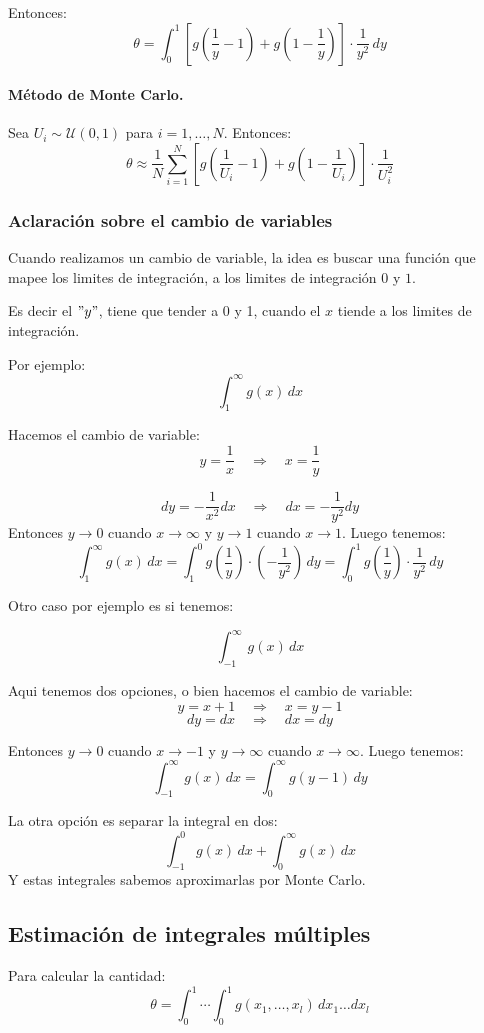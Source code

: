 \documentclass[11pt, a4paper]{article}
\theoremstyle{definition}
\begin{document}
Entonces:
\[
\theta = \int_{0}^{1} \left[ g\left(\frac{1}{y} - 1\right) + g\left(1 - \frac{1}{y}\right) \right] \cdot \frac{1}{y^2} \, dy
\]

\paragraph{Método de Monte Carlo.} Sea $U_i \sim \mathcal{U}(0,1)$ para $i = 1, \ldots, N$. Entonces:
\[
\theta \approx \frac{1}{N} \sum_{i=1}^{N} \left[ g\left(\frac{1}{U_i} - 1\right) + g\left(1 - \frac{1}{U_i} \right) \right] \cdot \frac{1}{U_i^2}
\]

\subsubsection*{Aclaración sobre el cambio de variables}

Cuando realizamos un cambio de variable, la idea es buscar una función que mapee los limites de integración, a los 
limites de integración $0$ y $1$.

Es decir el $"y"$, tiene que tender a 0 y 1, cuando el $x$ tiende a los limites de integración.

Por ejemplo:
\[
\int_{1}^{\infty} g(x) \, dx 
\]

Hacemos el cambio de variable:
\[
y = \frac{1}{x} \quad \Rightarrow \quad x = \frac{1}{y}
\]

\[
dy = -\frac{1}{x^2}dx \quad \Rightarrow \quad dx = -\frac{1}{y^2}dy
\]
Entonces $y \to 0$ cuando $x \to \infty$ y $y \to 1$ cuando $x \to 1$. Luego tenemos:
\[
\int_{1}^{\infty} g(x) \, dx = \int_{1}^{0} g\left(\frac{1}{y}\right) \cdot \left(-\frac{1}{y^2}\right) \, dy = \int_{0}^{1} g\left(\frac{1}{y}\right) \cdot \frac{1}{y^2} \, dy
\]

Otro caso por ejemplo es si tenemos:

\[
\int_{-1}^{\infty} g(x) \, dx
\]

Aqui tenemos dos opciones, o bien hacemos el cambio de variable:
\[
y = x + 1 \quad \Rightarrow \quad x = y - 1
\]
\[
dy = dx \quad \Rightarrow \quad dx = dy
\]

Entonces $y \to 0$ cuando $x \to -1$ y $y \to \infty$ cuando $x \to \infty$. Luego tenemos:
\[
\int_{-1}^{\infty} g(x) \, dx = \int_{0}^{\infty} g(y - 1) \, dy
\]

La otra opción es separar la integral en dos:
\[
\int_{-1}^{0} g(x) \, dx + \int_{0}^{\infty} g(x) \, dx
\]
Y estas integrales sabemos aproximarlas por Monte Carlo.

\subsection{Estimación de integrales múltiples}
Para calcular la cantidad:
\[
\theta = \int_{0}^{1} \cdots \int_{0}^{1} g(x_1, \ldots, x_l) \, dx_1 \ldots dx_l
\]
\end{document}
